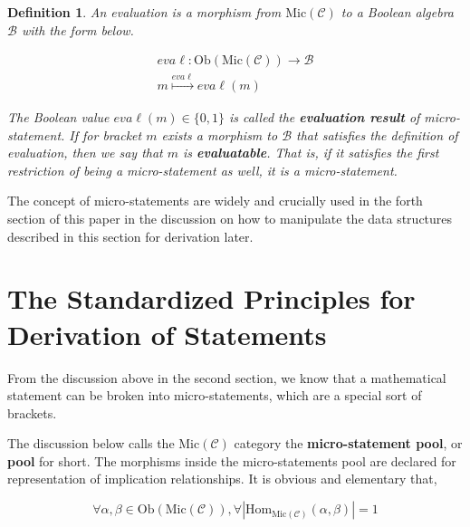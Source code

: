 \documentclass{aims}
\numberwithin{equation}{section}
\newtheorem{definition}{Definition}	%
\numberwithin{theorem}{section}	%
\numberwithin{axiom}{section}	%
\numberwithin{definition}{section}	%
\begin{document}
	\begin{definition}
		An evaluation is a morphism from \(\text{Mic}(\mathcal{C})\) to a Boolean algebra \(\mathcal{B}\) with the form below.
		
		\begin{equation}
			\begin{gathered}
				\mathit{e}\mathit{v}\mathit{a}\ell :\text{Ob}(\text{Mic}(\mathcal{C}))\to \mathcal{B}\\
				\mathit{m}\overset{\mathit{e}\mathit{v}\mathit{a}\ell }{\mapsto }\mathit{e}\mathit{v}\mathit{a}\ell (\mathit{m})
			\end{gathered}
		\end{equation}
		
		The Boolean value \(\mathit{e}\mathit{v}\mathit{a}\ell (\mathit{m})\in \{0,1\}\) is called the \textbf{ evaluation result} of micro-statement. If for bracket \(\mathit{m}\) exists a morphism to \(\mathcal{B}\) that satisfies the definition of evaluation, then we say that \(\mathit{m}\) is \textbf{ evaluatable}. That is, if it satisfies the first restriction of being a micro-statement as well, it is a micro-statement.
	\end{definition}
	
	The concept of micro-statements are widely and crucially used in the forth section of this paper in the discussion on how to manipulate the data structures described in this section for derivation later.
	
	\section{The Standardized Principles for Derivation of Statements}
	
	From the discussion above in the second section, we know that a mathematical statement can be broken into micro-statements, which are a special sort of brackets.
	
	The discussion below calls the \(\text{Mic}(\mathcal{C})\) category the \textbf{ micro-statement pool}, or \textbf{ pool} for short. The morphisms inside the micro-statements pool are declared for representation of implication relationships. It is obvious and elementary that,
	
	\begin{equation}
		\forall \alpha ,\beta \in \text{Ob}(\text{Mic}(\mathcal{C})), \forall \left|\text{Hom}_{\text{Mic}(\mathcal{C})}(\alpha ,\beta )\right|=1
	\end{equation}
	
\end{document}
